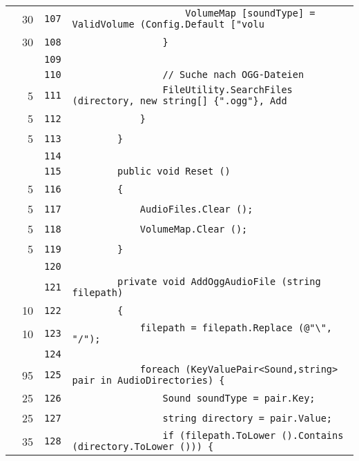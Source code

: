 \documentclass[a4paper,10pt]{article}
\begin{document}
\begin{longtable}[l]{lrrl}
\cellcolor{green} & 30 & \verb~107~ & \verb~                    VolumeMap [soundType] = ValidVolume (Config.Default ["volu~\\
\cellcolor{green} & 30 & \verb~108~ & \verb~                }~\\
\cellcolor{gray} &  & \verb~109~ & \verb~~\\
\cellcolor{gray} &  & \verb~110~ & \verb~                // Suche nach OGG-Dateien~\\
\cellcolor{green} & 5 & \verb~111~ & \verb~                FileUtility.SearchFiles (directory, new string[] {".ogg"}, Add~\\
\cellcolor{green} & 5 & \verb~112~ & \verb~            }~\\
\cellcolor{green} & 5 & \verb~113~ & \verb~        }~\\
\cellcolor{gray} &  & \verb~114~ & \verb~~\\
\cellcolor{gray} &  & \verb~115~ & \verb~        public void Reset ()~\\
\cellcolor{green} & 5 & \verb~116~ & \verb~        {~\\
\cellcolor{green} & 5 & \verb~117~ & \verb~            AudioFiles.Clear ();~\\
\cellcolor{green} & 5 & \verb~118~ & \verb~            VolumeMap.Clear ();~\\
\cellcolor{green} & 5 & \verb~119~ & \verb~        }~\\
\cellcolor{gray} &  & \verb~120~ & \verb~~\\
\cellcolor{gray} &  & \verb~121~ & \verb~        private void AddOggAudioFile (string filepath)~\\
\cellcolor{green} & 10 & \verb~122~ & \verb~        {~\\
\cellcolor{green} & 10 & \verb~123~ & \verb~            filepath = filepath.Replace (@"\", "/");~\\
\cellcolor{gray} &  & \verb~124~ & \verb~~\\
\cellcolor{green} & 95 & \verb~125~ & \verb~            foreach (KeyValuePair<Sound,string> pair in AudioDirectories) {~\\
\cellcolor{green} & 25 & \verb~126~ & \verb~                Sound soundType = pair.Key;~\\
\cellcolor{green} & 25 & \verb~127~ & \verb~                string directory = pair.Value;~\\
\cellcolor{green} & 35 & \verb~128~ & \verb~                if (filepath.ToLower ().Contains (directory.ToLower ())) {~\\

\end{longtable}
\end{document}
